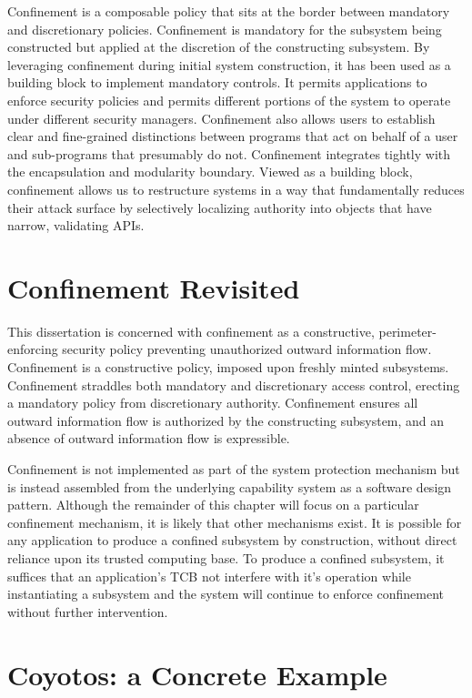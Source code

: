 Confinement is a composable policy that sits at the border between mandatory and discretionary policies.
Confinement is mandatory for the subsystem being constructed but applied at the discretion of the constructing subsystem.
By leveraging confinement during initial system construction, it has been used as a building block to implement mandatory controls.\cite{KeySafe}
It permits applications to enforce security policies and permits different portions of the system to operate under different security managers.
Confinement also allows users to establish clear and fine-grained distinctions between programs that act on behalf of a user and sub-programs that presumably do not.
Confinement integrates tightly with the encapsulation and modularity boundary.
Viewed as a building block, confinement allows us to restructure systems in a way that fundamentally reduces their attack surface by selectively localizing authority into objects that have narrow, validating APIs.

\section{Confinement Revisited}

This dissertation is concerned with confinement as a constructive, perimeter-enforcing security policy preventing unauthorized outward information flow.
Confinement is a constructive policy, imposed upon freshly minted subsystems.
Confinement straddles both mandatory and discretionary access control, erecting a mandatory policy from discretionary authority.
Confinement ensures all outward information flow is authorized by the constructing subsystem, and an absence of outward information flow is expressible.

Confinement is not implemented as part of the system protection mechanism but is instead assembled from the underlying capability system as a software design pattern.
Although the remainder of this chapter will focus on a particular confinement mechanism, it is likely that other mechanisms exist.
It is possible for any application to produce a confined subsystem by construction, without direct reliance upon its trusted computing base.
To produce a confined subsystem, it suffices that an application's TCB not interfere with it's operation while instantiating a subsystem and the system will continue to enforce confinement without further intervention.

\section{Coyotos: a Concrete Example}

